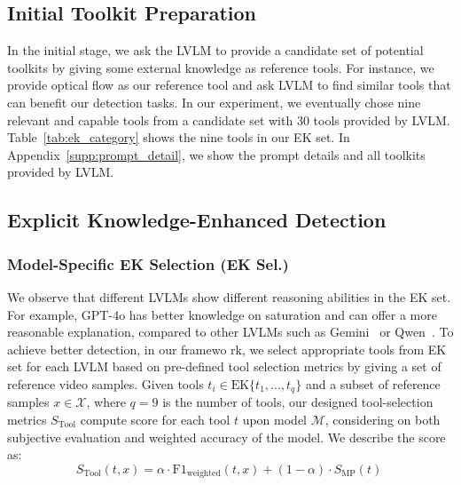 \subsection{Initial Toolkit Preparation}
In the initial stage, we ask the LVLM to provide a candidate set of potential toolkits by giving some external knowledge as reference tools. For instance, we provide optical flow as our reference tool and ask LVLM to find similar tools that can benefit our detection tasks. In our experiment, we eventually chose nine relevant and capable tools from a candidate set with 30 tools provided by LVLM. Table~\ref{tab:ek_category} shows the nine tools in our EK set. In Appendix~\ref{supp:prompt_detail}, we show the prompt details and all toolkits provided by LVLM. 






\subsection{Explicit Knowledge-Enhanced Detection}

\subsubsection{Model-Specific EK Selection (EK Sel.)}
We observe that different LVLMs show different reasoning abilities in the EK set. For example, GPT-4o has better knowledge on saturation and can offer a more reasonable explanation, compared to other LVLMs such as Gemini~\cite{google2024gemini} or Qwen~\cite{qwen2023qwenvl}. To achieve better detection, in our framewo  rk, we select appropriate tools from EK set for each LVLM based on pre-defined tool selection metrics by giving a set of reference video samples. 
Given tools $t_i \in \text{EK}\{t_1, ..., t_q\}$ and a subset of reference samples $x \in \mathcal{X}$, where $q=9$ is the number of tools, our designed tool-selection metrics $S_{\text{Tool}}$ compute score for each tool $t$ upon model $\mathcal{M}$, considering on both subjective evaluation and weighted accuracy of the model. We describe the score as:
\begin{equation}
    S_{\text{Tool}}(t, x) = \alpha \cdot \text{F1}_{\text{weighted}}(t,x) + (1 - \alpha) \cdot S_{\text{MP}}(t) \ \nonumber
\label{eqn:selection_metrics}
\end{equation}

